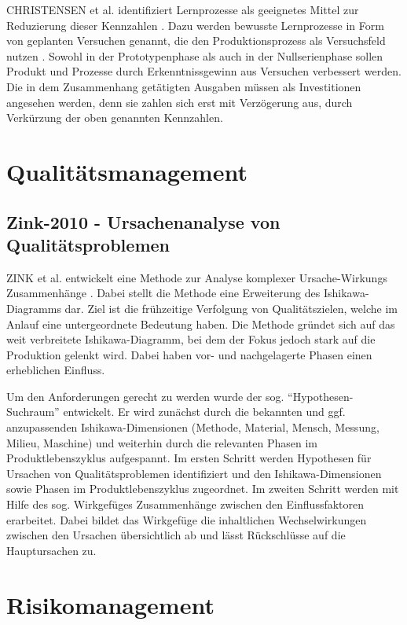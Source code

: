 CHRISTENSEN et al. identifiziert Lernprozesse als geeignetes Mittel zur Reduzierung dieser Kennzahlen \cite{Christensen2016}.
Dazu werden bewusste Lernprozesse in Form von geplanten Versuchen genannt, die den Produktionsprozess als Versuchsfeld nutzen \cite{Terwiesch2001}.  Sowohl in der Prototypenphase als auch in der Nullserienphase sollen Produkt und Prozesse durch Erkenntnissgewinn aus Versuchen verbessert werden. Die in dem Zusammenhang getätigten Ausgaben müssen als Investitionen angesehen werden, denn sie zahlen sich erst mit Verzögerung aus, durch Verkürzung der oben genannten Kennzahlen. 


\section{Qualitätsmanagement}

\subsection*{Zink-2010 - Ursachenanalyse von Qualitätsproblemen}

ZINK et al. entwickelt eine Methode zur Analyse komplexer Ursache-Wirkungs Zusammenhänge \cite{Zink2010}. Dabei stellt die Methode eine Erweiterung des Ishikawa-Diagramms dar. Ziel ist die frühzeitige Verfolgung von Qualitätszielen, welche im Anlauf eine untergeordnete Bedeutung haben. %
Die Methode gründet sich auf das weit verbreitete Ishikawa-Diagramm, bei dem der Fokus jedoch stark auf die Produktion gelenkt wird. Dabei haben vor- und nachgelagerte Phasen einen erheblichen Einfluss. 

Um den Anforderungen gerecht zu werden wurde der sog. ``Hypothesen-Suchraum'' entwickelt. Er wird zunächst durch die bekannten und ggf. anzupassenden Ishikawa-Dimensionen (Methode, Material, Mensch, Messung, Milieu, Maschine) und weiterhin durch die relevanten Phasen im Produktlebenszyklus aufgespannt. 
Im ersten Schritt werden Hypothesen für Ursachen von Qualitätsproblemen identifiziert und den Ishikawa-Dimensionen sowie Phasen im Produktlebenszyklus zugeordnet. 
Im zweiten Schritt werden mit Hilfe des sog. Wirkgefüges Zusammenhänge zwischen den Einflussfaktoren erarbeitet. Dabei bildet das Wirkgefüge die inhaltlichen Wechselwirkungen zwischen den Ursachen übersichtlich ab und lässt Rückschlüsse auf die Hauptursachen zu. 

\section{Risikomanagement}

